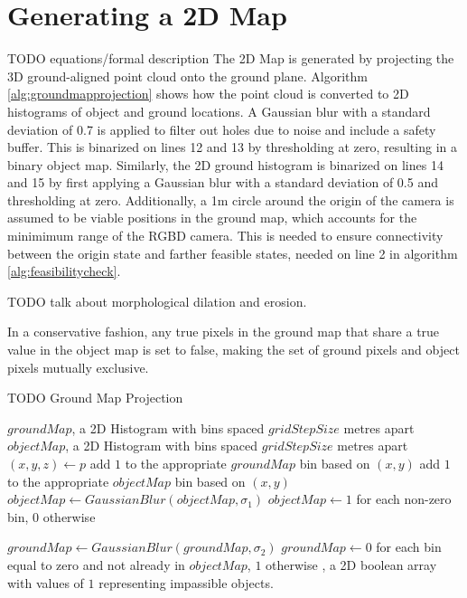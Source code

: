 \section{Generating a 2D Map}
\label{sec:2dmap}
TODO equations/formal description
The 2D Map is generated by projecting the 3D ground-aligned point cloud onto the
ground plane.
Algorithm \autoref{alg:groundmapprojection} shows how the point cloud is
converted to 2D histograms of object and ground locations. 
A Gaussian blur with
a standard deviation of 0.7 is applied to filter out holes due to noise and
include a safety buffer. This is binarized on lines 12 and 13 by thresholding at
zero, resulting in a binary object map.
Similarly, the 2D ground histogram is binarized on lines 14 and 15 by first applying a Gaussian
blur with a standard deviation of 0.5 and thresholding at zero. 
Additionally, a 1m circle around the origin of the camera is assumed to be
viable positions in the ground map, which accounts for the minimimum range of
the RGBD camera. This is needed to ensure connectivity between the origin state
and farther feasible states, needed on line 2 in algorithm
\autoref{alg:feasibilitycheck}.

TODO talk about morphological dilation and erosion.

In a conservative fashion, any true pixels in the ground map that share a true
value in the object map is set to false, making the set of ground pixels and
object pixels mutually exclusive. 

\begin{algorithm}
\caption{TODO Ground Map Projection}
\label{alg:groundmapprojection}
\begin{algorithmic}[1]
\Statex
{}
    \State $groundMap$, a 2D Histogram with bins spaced $gridStepSize$ metres apart
    \State $objectMap$, a 2D Histogram with bins spaced $gridStepSize$ metres apart
        \State $(x,y,z) \gets p$
            \State add $1$ to the appropriate $groundMap$ bin based on $(x,y)$
        \Else
            \State add $1$ to the appropriate $objectMap$ bin based on $(x,y)$
        \EndIf
    \EndFor
    \State $objectMap \gets GaussianBlur(objectMap, \sigma_1)$
    \State $objectMap \gets 1$ for each non-zero bin, $0$ otherwise

    \State $groundMap \gets GaussianBlur(groundMap, \sigma_2)$
    \State $groundMap \gets 0$ for each bin equal to zero and not already in $objectMap$, $1$ otherwise
\EndFunction
\Statex
{}, a 2D boolean array with values of $1$ representing
impassible objects.
\end{algorithmic}
\end{algorithm}

